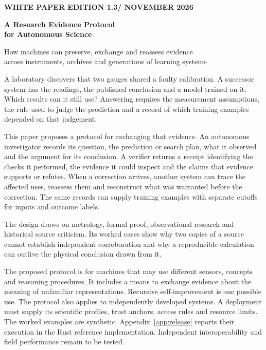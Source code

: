 \documentclass[11pt,a4paper]{article}
\newcommand{\edition}{1.3}
\newcommand{\topic}[1]{\par\smallskip{\sffamily\bfseries\color{ink}#1\par}\nobreak}
\begin{document}
\thispagestyle{empty}
{\sffamily\small\bfseries\color{accent}WHITE PAPER \hfill EDITION \edition\enspace /  NOVEMBER 2026\par}
\vspace{11mm}

{\fontsize{31}{36}\selectfont\bfseries\color{ink}A Research Evidence Protocol\\for Autonomous Science\par}
\vspace{3mm}
{\large How machines can preserve, exchange and reassess evidence\\across instruments, archives and generations of learning systems\par}
\vspace{7mm}

\topic{Abstract}
A laboratory discovers that two gauges shared a faulty calibration. A successor system has the readings, the published conclusion and a model trained on it. Which results can it still use? Answering requires the measurement assumptions, the rule used to judge the prediction and a record of which training examples depended on that judgement.

This paper proposes a protocol for exchanging that evidence. An autonomous investigator records its question, the prediction or search plan, what it observed and the argument for its conclusion. A verifier returns a receipt identifying the checks it performed, the evidence it could inspect and the claims that evidence supports or refutes. When a correction arrives, another system can trace the affected uses, reassess them and reconstruct what was warranted before the correction. The same records can supply training examples with separate cutoffs for inputs and outcome labels.

The design draws on metrology, formal proof, observational research and historical source criticism. Its worked cases show why two copies of a source cannot establish independent corroboration and why a reproducible calculation can outlive the physical conclusion drawn from it.

\topic{Scope of this edition}
The proposed protocol is for machines that may use different sensors, concepts and reasoning procedures. It includes a means to exchange evidence about the meaning of unfamiliar representations. Recursive self-improvement is one possible use. The protocol also applies to independently developed systems. A deployment must supply its scientific profiles, trust anchors, access rules and resource limits. The worked examples are synthetic. Appendix~\ref{app:release} reports their execution in the Rust reference implementation. Independent interoperability and field performance remain to be tested.
\end{document}
